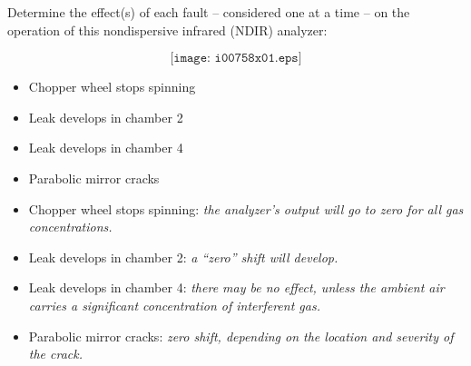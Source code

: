 

Determine the effect(s) of each fault -- considered one at a time -- on the operation of this nondispersive infrared (NDIR) analyzer:

$$\texttt{[image: i00758x01.eps]}$$

\begin{itemize}
\item{} Chopper wheel stops spinning
\vskip 10pt
\item{} Leak develops in chamber 2
\vskip 10pt
\item{} Leak develops in chamber 4
\vskip 10pt
\item{} Parabolic mirror cracks
\end{itemize}







\begin{itemize}
\item{} Chopper wheel stops spinning: {\it the analyzer's output will go to zero for all gas concentrations.}
\vskip 10pt
\item{} Leak develops in chamber 2: {\it a ``zero'' shift will develop.}
\vskip 10pt
\item{} Leak develops in chamber 4: {\it there may be no effect, unless the ambient air carries a significant concentration of interferent gas.}
\vskip 10pt
\item{} Parabolic mirror cracks: {\it zero shift, depending on the location and severity of the crack.}
\end{itemize}











